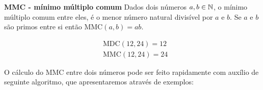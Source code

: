  \vskip0.3cm

 \colorbox{azul}{
 \begin{minipage}{0.9\linewidth}
 \begin{center}
 \textbf{MMC - mínimo múltiplo comum}
 Dados dois números $a, b \in \mathbb{N}$, o mínimo múltiplo comum entre eles, é o menor número natural divisível por $a$ e $b$. Se $a$ e $b$ são primos entre si então MMC$(a, b)= ab$.
 \end{center}
 \end{minipage}}


 \begin{exem}
 \begin{align*}
 & \text{MDC}(12, 24)= 12 \\
 & \text{MMC}(12, 24)= 24
 \end{align*}
 \end{exem}

 O cálculo do MMC entre dois números pode ser feito rapidamente com auxílio de seguinte algoritmo, que apresentaremos através de exemplos:

